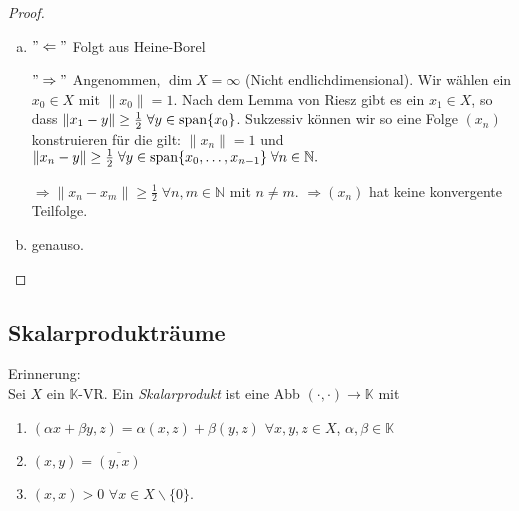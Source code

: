 \documentclass[ngerman]{report}
\theoremstyle{plain}%
\theoremstyle{definition}%
\theoremstyle{myStyle}
\newcommand{\N}{\mathbb{N}}
\newcommand{\K}{\mathbb{K}}
\newcommand{\aufspan}{\textnormal{span}}
\newcommand{\norm}[1]{\|#1\|}
\newcommand{\df}[1][]{%
	\overset{#1}{\Rightarrow}
}
\newcommand{\ov}[1]{\overline{#1}}
\begin{document}
	\begin{proof}
		 \begin{enumerate}[a)]
			 \item $"\Leftarrow"$ Folgt aus Heine-Borel\par
				$"\Rightarrow"$ Angenommen, $\dim X = \infty$ (Nicht endlichdimensional). 
				Wir wählen ein $x_0 \in X$ mit $\norm{x_0} = 1$. Nach dem Lemma von Riesz gibt es ein $x_1 \in X$, so dass 
				$\norm{x_1 - y} \geq \frac{1}{2} \; \forall y \in \aufspan\{x_0\}$. 
				Sukzessiv können wir so eine Folge $(x_n)$ konstruieren für die gilt: $\norm{x_n} = 1$ und $\norm{x_n - y} \geq \frac{1}{2} \; \forall y\in \aufspan\{x_0,\dots,x_{n-1}\}\; \forall n\in\N.$ \par
				$\df \norm{x_n - x_m} \geq \frac{1}{2}\; \forall n,m \in \N$  mit $n \not = m$. 
				$\df (x_n)$ hat keine konvergente Teilfolge. \par
			\item genauso.
		\end{enumerate}
	\end{proof}

	\subsection{Skalarprodukträume}
Erinnerung:\\
	Sei $X$ ein $\K$-VR. Ein \textit{Skalarprodukt} ist eine Abb $(\cdot,\cdot) \to \K$ mit 
	\begin{enumerate}[(S1)]
		\item $(\alpha x + \beta y, z) = \alpha (x,z) + \beta (y,z)$ $\forall x,y,z \in X$, $\alpha,\beta \in \K$
		\item $(x,y) = \ov{(y,x)}$
		\item $(x,x) > 0$  $\forall x\in X\backslash\{0\}$.
	\end{enumerate}
\end{document}
